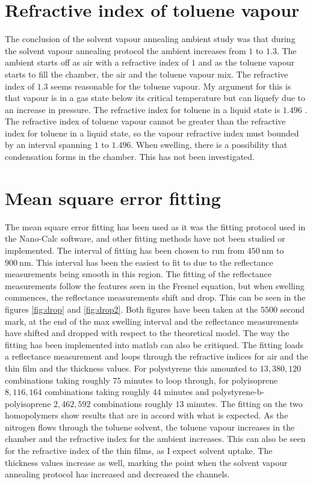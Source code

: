 \documentclass[MasterThesisMain.tex]{subfiles}
\begin{document}
\section{Refractive index of toluene vapour}   
The conclusion of the solvent vapour annealing ambient study was that during the solvent vapour annealing protocol the ambient increases from $1$ to $1.3$. The ambient starts off as air with a refractive index of $1$ and as the toluene vapour starts to fill the chamber, the air and the toluene vapour mix. The refractive index of $1.3$ seems reasonable for the toluene vapour. My argument for this is that vapour is in a gas state below its critical temperature but can liquefy due to an increase in pressure. The refractive index for toluene in a liquid state is $1.496$ \cite{toluene}. The refractive index of toluene vapour cannot be greater than the refractive index for toluene in a liquid state, so the vapour refractive index must bounded by an interval spanning $1$ to $1.496$. When swelling, there is a possibility that condensation forms in the chamber. This has not been investigated.  

\section{Mean square error fitting}
The mean square error fitting has been used as it was the fitting protocol used in the Nano-Calc software, and other fitting methods have not been studied or implemented. The interval of fitting has been chosen to run from $\SI{450}{\nano\meter}$ to $\SI{900}{\nano\meter}$. This interval has been the easiest to fit to due to the reflectance measurements being smooth in this region. The fitting of the reflectance measurements follow the features seen in the Fresnel equation, but when swelling commences, the reflectance measurements shift and drop. This can be seen in the figures \ref{fig:drop} and \ref{fig:drop2}. Both figures have been taken at the $5500$ second mark, at the end of the max swelling interval and the reflectance measurements have shifted and dropped with respect to the theoretical model. The way the fitting has been implemented into matlab can also be critiqued. The fitting loads a reflectance measurement and loops through the refractive indices for air and the thin film and the thickness values. For polystyrene this amounted to $13,380,120$ combinations taking roughly $75$ minutes to loop through, for polyisoprene $8,116,164$ combinations taking roughly $44$ minutes and polystyrene-b-polyisoprene $2,462,592$ combinations roughly $13$ minutes. The fitting on the two homopolymers show results that are in accord with what is expected. As the nitrogen flows through the toluene solvent, the toluene vapour increases in the chamber and the refractive index for the ambient increases. This can also be seen for the refractive index of the thin films, as I expect solvent uptake. The thickness values increase as well, marking the point when the solvent vapour annealing protocol has increased and decreased the channels. 
\end{document}

